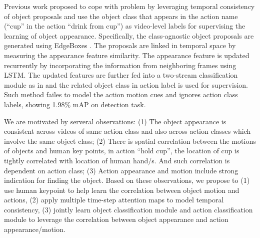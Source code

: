 Previous work \cite{yuan2017temporal} proposed to cope with problem by leveraging temporal consistency of object proposals and use the object class that appears in the action name (\eg ``cup'' in the action ``drink from cup'') as video-level labels for supervising the learning of object appearance. Specifically, the class-agnostic object proposals are generated using EdgeBoxes \cite{zitnick2014edge}. The proposals are linked in temporal space by measuring the appearance feature similarity. The appearance feature is updated recurrently by incorporating the information from neighboring frames using LSTM. The updated features are further fed into a two-stream classification module as in \cite{bilen2016weakly} and the related object class in action label is used for supervision. Such method failes to model the action motion cues and ignores action class labels, showing 1.98\% mAP on detection task.  

We are motivated by serveral observations: (1) The object appearance is consistent across videos of same action class and also across action classes which involve the same object class; (2) There is spatial correlation between the motions of objects and human key points, \eg in action ``hold cup'', the location of cup is tightly correlated with location of human hand/s. And such correlation is dependent on action class; (3) Action appearance and motion include strong indication for finding the object. Based on these observations, we propose to (1) use human keypoint to help learn the correlation between object motion and actions, (2) apply multiple time-step attention maps to model temporal consistency, (3) jointly learn object classification module and action classification module to leverage the correlation between object appearance and action appearance/motion.

